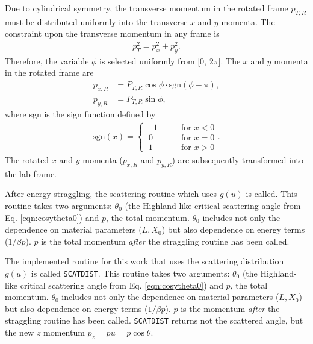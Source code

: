 Due to cylindrical symmetry, the transverse momentum in the rotated frame $p_{T,R}$ must be distributed uniformly into the transverse $x$ and $y$ momenta. The constraint upon the transverse momentum in any frame is
\begin{align*}
p_T^2=p_x ^2+ p_y ^2.
\end{align*}
Therefore, the variable $\phi$ is selected uniformly from [0, 2$\pi$]. The $x$ and $y$ momenta in the rotated frame are
\begin{align*}
p_{x,R}&=P_{T,R}\cos\phi\cdot \text{sgn}(\phi-\pi),\\
p_{y,R}&=P_{T,R}\sin\phi,
\end{align*}
where sgn is the sign function defined by
\begin{align*}
\text{sgn}(x)=	\begin{cases}
		-1 &\qquad \text{for }x<0\\
		\ 0 &\qquad \text{for }x=0\\
		\ 1 &\qquad \text{for }x>0
		\end{cases}.
\end{align*}
The rotated $x$ and $y$ momenta ($p_{x,R}$ and $p_{y,R}$) are subsequently transformed into the lab frame. 
\iffalse





After energy straggling, the scattering routine which uses $g(u)$ is called.  This routine takes two arguments: $\theta_0$ (the Highland-like critical scattering angle from Eq. \eqref{eqn:cosytheta0}) and $p$, the total momentum. $\theta_0$ includes not only the dependence on material parameters ($L, X_0$) but also dependence on energy terms ($1/\beta p$). $p$ is the total momentum \textit{after} the straggling routine has been called.


The implemented routine for this work that uses the scattering distribution $g(u)$ is called \texttt{SCATDIST}. This routine takes two arguments: $\theta_0$ (the Highland-like critical scattering angle from Eq. \eqref{eqn:cosytheta0}) and $p$, the total momentum. $\theta_0$ includes not only the dependence on material parameters ($L, X_0$) but also dependence on energy terms ($1/\beta p$). $p$ is the momentum \textit{after} the straggling routine has been called. \texttt{SCATDIST} returns not the scattered angle, but the new $z$ momentum $p_z=pu=p\cos\theta$. 

